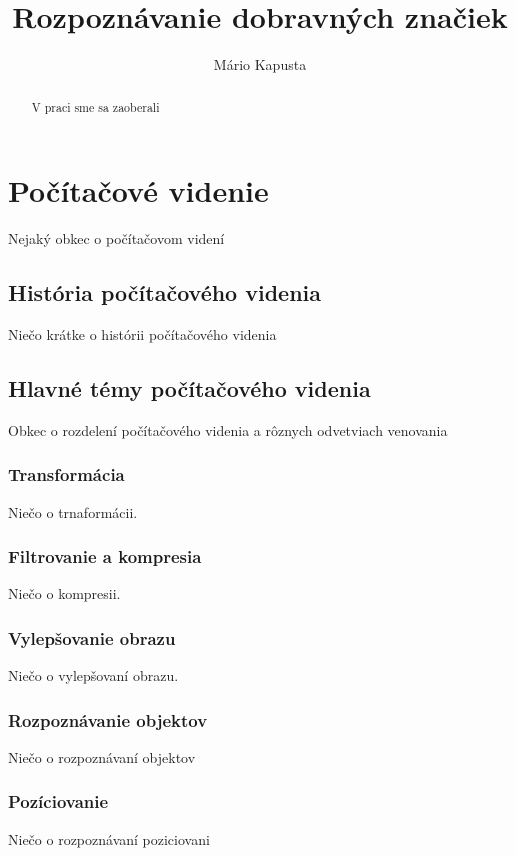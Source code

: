 \documentclass[12pt]{article}
\begin{document}
\title{Rozpoznávanie dobravných značiek}

\author{Mário Kapusta}
\maketitle
\thispagestyle{empty}
\clearpage
\tableofcontents
{}
\thispagestyle{empty}
\clearpage
\listoftables
\thispagestyle{empty}
\clearpage
\listoffigures
\thispagestyle{empty}
\clearpage
\begin{abstract}
V praci sme sa zaoberali
\end{abstract}
\clearpage

\section{Počítačové videnie}
Nejaký obkec o počítačovom videní
\subsection{História počítačového videnia}
Niečo krátke o histórii počítačového videnia
\subsection{Hlavné témy počítačového videnia}
Obkec o rozdelení počítačového videnia a rôznych odvetviach venovania
\subsubsection{Transformácia}
Niečo o trnaformácii.
\subsubsection{Filtrovanie a kompresia}
Niečo o kompresii.
\subsubsection{Vylepšovanie obrazu}
Niečo o vylepšovaní obrazu.
\subsubsection{Rozpoznávanie objektov}
Niečo o rozpoznávaní objektov
\subsubsection{Pozíciovanie}
Niečo o rozpoznávaní poziciovani
\end{document}
